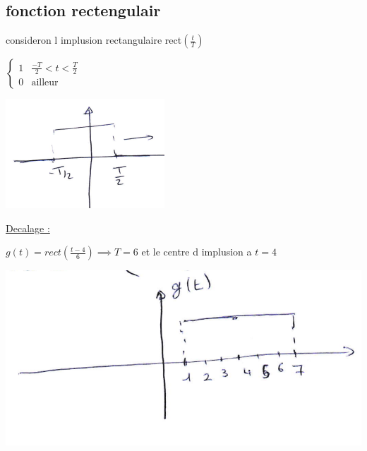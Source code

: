 \documentclass[12pt]{book}
\begin{document}
            \subsection{fonction rectengulair}
                consideron l implusion rectangulaire rect$\left( \frac{t}{T} \right)$
                \begin{center}
                    \begin{minipage}{0,49\linewidth}
                        $\begin{cases}
                            1 & \frac{-T}{2}<t<\frac{T}{2}\\
                            0 & \text{ailleur}
                        \end{cases}$
                    \end{minipage}
                    \begin{minipage}{0,49\linewidth}
                        \includegraphics[width = \linewidth]{pic/focntionrectangulair.png}
                    \end{minipage}
                \end{center}
                \underline{Decalage :}
                \begin{center}
                    \begin{minipage}{0,49\linewidth}
                       $g(t) = rect(\frac{t-4}{6})\implies T=6 $ et le centre d implusion a $t=4$
                    \end{minipage}
                    \begin{minipage}{0,49\linewidth}
                        \includegraphics[width = \linewidth]{pic/decalagefonctionrectangulair.png}
                    \end{minipage}
                \end{center}
\end{document}

